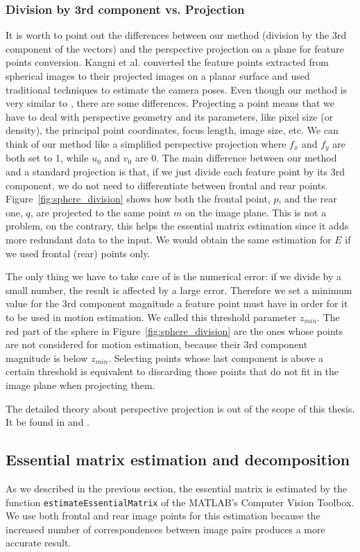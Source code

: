\subsubsection{Division by 3rd component vs. Projection}
It is worth to point out the differences between our method (division by the 3rd 
component of the vectors) and the perspective projection on a plane for feature
points conversion. Kangni et al. \cite{kangni2007orientation} converted the 
feature points extracted from spherical images to their projected images on a 
planar surface and used traditional techniques to estimate the camera poses.
Even though our method is very similar to \cite{kangni2007orientation}, there 
are some differences.
Projecting a point means that we have to deal with perspective geometry and its
parameters, like pixel size (or density), the principal point coordinates, 
focus length, image size, etc.
We can think of our method like a simplified perspective projection where
$f_x$ and $f_y$ are both set to 1, while $u_0$ and $v_0$ are 0.
The main difference between our method and a standard projection is that, if we
just divide each feature point by its 3rd component, we do not need to 
differentiate between frontal and rear points.
Figure~\ref{fig:sphere_division} shows how both the frontal point, $p$, and the 
rear one, $q$, are projected to the same point $m$ on the image plane.
This is not a problem, on the contrary, this helps the essential matrix 
estimation since it adds more redundant data to the input. We would obtain the
same estimation for $E$ if we used frontal (rear) points only.

The only thing we have to take care of is the numerical error: if we divide by a 
small number, the result is affected by a large error. Therefore we
set a minimum value for the 3rd component magnitude a feature point must 
have in order for it to be used in motion estimation. 
We called this threshold parameter $z_{min}$.
The red part of the sphere in Figure~\ref{fig:sphere_division} are the ones
whose points are not considered for motion estimation, because their 
3rd component magnitude is below $z_{min}$.
Selecting points whose last component is above a certain threshold is 
equivalent to discarding those points that do not fit in the image plane
when projecting them.

The detailed theory about perspective projection is out of the scope of this 
thesis. It be found in \cite{szeliski2010computer} and \cite{Hartley2004}.

\subsection{Essential matrix estimation and decomposition}
As we described in the previous section, the essential matrix is estimated 
by the function {\tt estimateEssentialMatrix} of the MATLAB's 
Computer Vision Toolbox.
We use both frontal and rear image points for this estimation because
the increased number of correspondences between image pairs produces 
a more accurate result.

